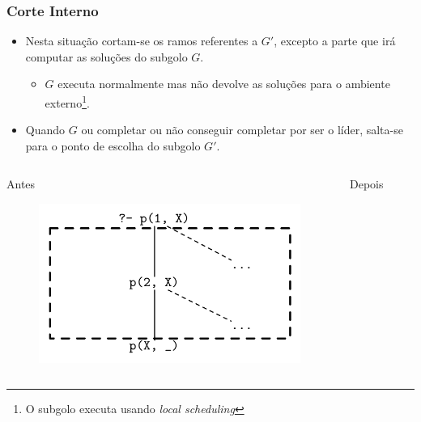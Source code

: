 \documentclass{beamer}
\begin{document}
\begin{frame}
   \frametitle{Corte Interno}
   \begin{itemize}
      \item Nesta situação cortam-se os ramos referentes a $G'$, excepto a parte que irá
      computar as soluções do subgolo $G$.
      \begin{itemize}
         \item $G$ executa normalmente mas não devolve as soluções para o ambiente externo\footnote{O subgolo
         executa usando \emph{local scheduling}}.
      \end{itemize}
      \item<2-> Quando $G$ ou completar ou não conseguir completar por ser o líder, salta-se para o ponto
      de escolha do subgolo $G'$.
   \end{itemize}
   \begin{columns}[t]
         \begin{block}{Antes}
           \begin{figure}[ht]
             \centering
               \includegraphics[scale=0.4]{internal1.pdf}
           \end{figure}
         \end{block}
         \pause
         \begin{block}{Depois}
           \begin{figure}[ht]
             \centering

\end{figure}
\end{block}
\end{columns}
\end{frame}
\end{document}
